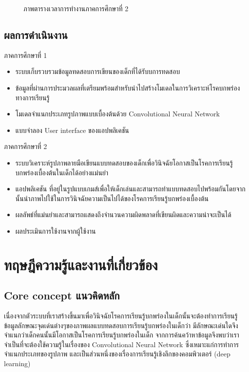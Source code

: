 \documentclass[12pt,oneside,openright,a4paper]{cpe-thai-project}
\begin{document}
\begin{landscape}
\begin{figure}[ht]
  \caption{ภาพตารางเวลาการทำงานภาคการศึกษาที่ 2}\label{fig:system}
 \end{figure}
\end{landscape}
\section{ผลการดำเนินงาน}
ภาคการศึกษาที่ 1 
\begin{itemize}
  \item ระบบเก็บรวบรวมข้อมูลทดสอบการเขียนของเด็กที่ได้รับบการทดสอบ
  \item ข้อมูลที่ผ่านการประมวลผลที่เตรียมพร้อมสำหรับนำไปสร้างโมเดลในการวิเคราะห์โรคบกพร่องทางการเรียนรู้
  \item โมเดลจำแนกประเภทรูปภาพแบบเบื้องต้นด้วย Convolutional Neural Network
  \item แบบจำลอง User interface ของแอปพลิเคชัน
\end{itemize}
ภาคการศึกษาที่ 2 
\begin{itemize}
  \item ระบบวิเคราะห์รูปภาพลายมือเขียนแบบทดสอบของเด็กเพื่อวินิจฉัยโอกาสเป็นโรคการเรียนรู้บกพร่องเบื้องต้นในเด็กได้อย่างแม่นยำ
  \item แอปพลิเคชัน ที่อยู่ในรูปแบบเกมส์เพื่อให้เด็กเล่นและสามารถทำแบบทดสอบไปพร้อมกันโดยจากนั้นนำภาพไปใช้ในการวินิจฉัยความเป็นไปได้ของโรคการเรียนรู้บกพร่องเบื้องต้น
  \item ผลลัพธ์ที่แม่นยำและสามารถแสดงถึงจำนวนความผิดพลาดที่เขียนผิดและความน่าจะเป็นได้
  \item ผลประเมินการใช้งานจากผู้ใช้งาน
\end{itemize}
\chapter{ทฤษฎีความรู้และงานที่เกี่ยวข้อง}
\section{Core concept แนวคิดหลัก}
เนื่องจากตัวระบบที่เราสร้างขึ้นมาเพื่อวินิจฉัยโรคการเรียนรู้บกพร่องในเด็กนั้นจะต้องทำการเรียนรู้ข้อมูลลักษณะจุดเด่นต่างๆของภาพผลแบบทดสอบการเรียนรู้บกพร่องในเด็กว่า 
มีลักษณะเด่นใดจึงจำแนกว่าเด็กคนนั้นมีโอกาสเป็นโรคการเรียนรู้บกพร่องในเด็ก 
จากการค้นคว้าหาข้อมูลจึงพบว่าเราจำเป็นที่จะต้องใช้ความรู้ในเรื่องของ Convolutional Neural Network 
ซึ่งเหมาะแก่การทำการจำแนกประเภทของรูปภาพ และเป็นส่วนหนึ่งของเรื่องการเรียนรู้เชิงลึกของคอมพิวเตอร์ (deep learning)
\end{document}
